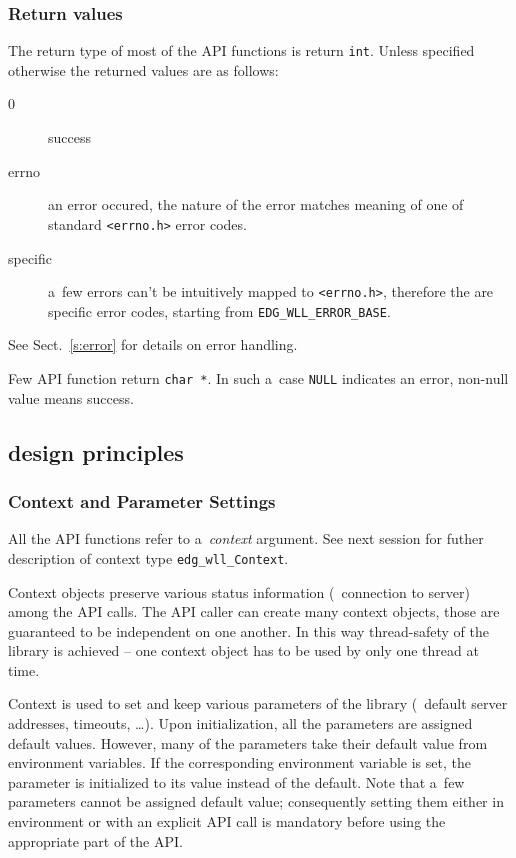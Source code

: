 \subsubsection{Return values}
The return type of most of the API functions is return \verb'int'.
Unless specified otherwise the returned values are as follows:
\begin{description}
\item[0] success
\item[errno] an error occured, the nature of the error
matches meaning of one of standard \verb'<errno.h>' error codes.
\item[\LB specific] a~few errors can't be intuitively mapped to
\verb'<errno.h>', therefore the are specific \LB error codes, starting from \verb'EDG_WLL_ERROR_BASE'.
\end{description}
See Sect.~\ref{s:error} for details on error handling.

Few API function return \verb'char *'. In such a~case \verb'NULL' indicates
an error, non-null value means success.

\subsection{\LB design principles}

\subsubsection{Context and Parameter Settings}
\label{s:context}

All the API functions refer to a~\emph{context} argument. See next
session for futher description of context type \verb'edg_wll_Context'.

Context objects preserve various status information
(\eg\ connection to server) among the API calls.
The API caller can create many context objects, those are guaranteed
to be independent on one another.
In this way thread-safety of the library is achieved --
one context object has to be used by only one thread at time.

Context is used to set and keep various parameters of the library
(\eg\ default server addresses, timeouts, \dots).
Upon initialization, all the parameters are assigned default values.
However, many of the parameters take their default value from environment
variables. If the corresponding environment variable is set,
the parameter is initialized to its value instead of the default.
Note that a~few parameters cannot be assigned default value; consequently
setting them either in environment or with an explicit API call
is mandatory before using the appropriate part of the API.


